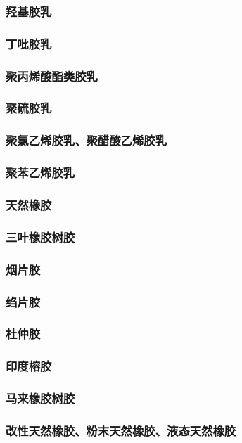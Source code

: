 \documentclass[UTF8]{../../ApplicationUniverse}
\begin{document}
        \subsubsection{羟基胶乳}
        \subsubsection{丁吡胶乳}
        \subsubsection{聚丙烯酸酯类胶乳}
        \subsubsection{聚硫胶乳}
            \subsubsection{聚氯乙烯胶乳、聚醋酸乙烯胶乳}
            \subsubsection{聚苯乙烯胶乳}
\subsubsection{天然橡胶}
    \subsubsection{三叶橡胶树胶}
        \subsubsection{烟片胶}
        \subsubsection{绉片胶}
    \subsubsection{杜仲胶}
    \subsubsection{印度榕胶}
    \subsubsection{马来橡胶树胶}
    \subsubsection{改性天然橡胶、粉末天然橡胶、液态天然橡胶}
\end{document}
